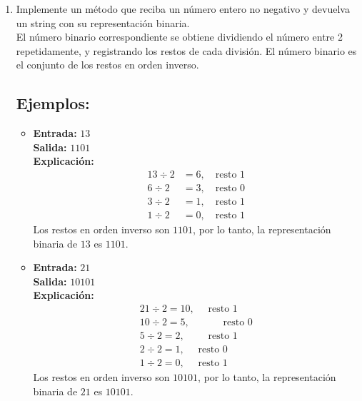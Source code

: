 \begin{enumerate}[label=\alph*)]
    \item Implemente un método que reciba un número entero no negativo y devuelva un string con su representación binaria.\\
    El número binario correspondiente se obtiene dividiendo el número entre 2 repetidamente, y registrando los restos de cada división. El número binario es el conjunto de los restos en orden inverso.

    \subsection*{Ejemplos:}
    \begin{itemize}
        \item \textbf{Entrada:} \( 13 \) \\
        \textbf{Salida:} \( \text{1101} \) \\
        \textbf{Explicación:}
        \[
        \begin{aligned}
        13 \div 2 &= 6, \quad \text{resto } 1 \\
        6 \div 2 &= 3, \quad \text{resto } 0 \\
        3 \div 2 &= 1, \quad \text{resto } 1 \\
        1 \div 2 &= 0, \quad \text{resto } 1
        \end{aligned}
        \]
        Los restos en orden inverso son \(1101\), por lo tanto, la representación binaria de \(13\) es \(1101\).

        \item \textbf{Entrada:} \( 21 \) \\
        \textbf{Salida:} \( \text{10101} \) \\
        \textbf{Explicación:}
        \[
        \begin{aligned}
        21 \div 2 = 10,\quad \text{ resto } 1 \\
        10 \div 2 = 5,\quad\quad\quad \text{ resto } 0 \\
        5 \div 2 = 2,\quad\quad \text{ resto } 1 \\
        2 \div 2 = 1,\quad \text{ resto } 0 \\
        1 \div 2 = 0,\quad \text{ resto } 1
        \end{aligned}
        \]
        Los restos en orden inverso son \(10101\), por lo tanto, la representación binaria de \(21\) es \(10101\).
    \end{itemize}
\end{enumerate}
